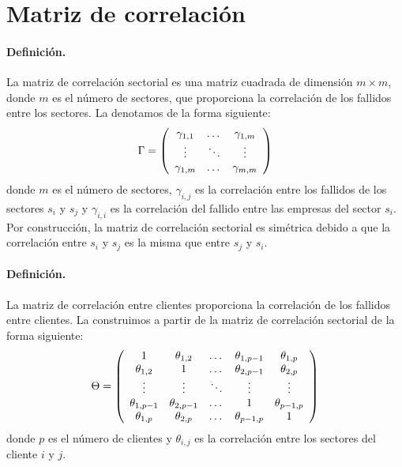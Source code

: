 
\section{Matriz de correlaci\'on}
\label{sec:mcorrel}

\paragraph{Definici\'on.} La matriz de correlaci\'on sectorial es una matriz
cuadrada de dimensi\'on $m \times m$, donde $m$ es el n\'umero de sectores, 
que proporciona la correlaci\'on de los fallidos entre los sectores. 
La denotamos de la forma siguiente:
\begin{displaymath}
\Gamma = \left(
\begin{array}{ccc}
\gamma_{1,1} & \dots  & \gamma_{1,m} \cr
\vdots & \ddots & \vdots \cr
\gamma_{1,m} & \dots  & \gamma_{m,m} 
\end{array}
\right)
\end{displaymath}
donde $m$ es el n\'umero de sectores, $\gamma_{i,j}$ es la correlaci\'on entre 
los fallidos de los sectores $s_i$ y $s_j$ y $\gamma_{i,i}$ es la correlaci\'on del 
fallido entre las empresas del sector $s_i$. Por construcci\'on, la matriz de 
correlaci\'on sectorial es sim\'etrica debido a que la correlaci\'on entre $s_i$
y $s_j$ es la misma que entre $s_j$ y $s_i$.

\paragraph{Definici\'on.} La matriz de correlaci\'on entre clientes proporciona
la correlaci\'on de los fallidos entre clientes. La construimos a partir de la
matriz de correlaci\'on sectorial de la forma siguiente:
\begin{displaymath}
\Theta = \left(
\begin{array}{ccccc}
1              & \theta_{1,2}   & \dots      & \theta_{1,p-1} & \theta_{1,p}   \cr
\theta_{1,2}   & 1              & \dots      & \theta_{2,p-1} & \theta_{2,p}   \cr
\vdots         & \vdots         & \ddots     & \vdots         & \vdots         \cr
\theta_{1,p-1} & \theta_{2,p-1} & \dots      & 1              & \theta_{p-1,p} \cr
\theta_{1,p}   & \theta_{2,p}   & \dots      & \theta_{p-1,p} & 1
\end{array}
\right)
\end{displaymath}
donde $p$ es el n\'umero de clientes y $\theta_{i,j}$ es la correlaci\'on entre
los sectores del cliente $i$ y $j$.

